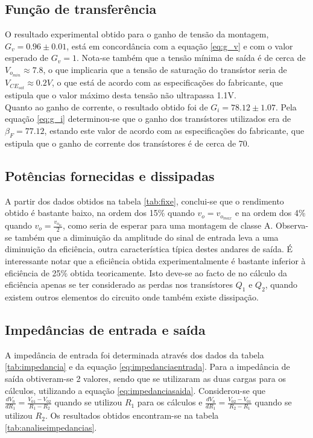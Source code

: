 \documentclass[%
  reprint,
  nofootinbib,
  amsmath,amssymb,
  aps,
  10pt,
  a4paper
]{revtex4-1}
\begin{document}
\subsection{Função de transferência}
O resultado experimental obtido para o ganho de tensão da montagem, $G_v=0.96\pm0.01$, está em concordância com a equação \ref{eq:g_v} e com o valor esperado de $G_v=1$. Nota-se também que a tensão mínima de saída é de cerca de $V_{o_{min}}\approx7.8$, o que implicaria que a tensão de saturação do transístor seria de $V_{{CE}_{sat}}\approx0.2V$, o que está de acordo com as especificações do fabricante, que estipula que o valor máximo desta tensão não ultrapassa 1.1V.\\
Quanto ao ganho de corrente, o resultado obtido foi de $G_i=78.12\pm1.07$. Pela equação \ref{eq:g_i} determinou-se que o ganho dos transístores utilizados era de $\beta_F=77.12$, estando este valor de acordo com as especificações do fabricante, que estipula que o ganho de corrente dos transístores é de cerca de 70.

\subsection{Potências fornecidas e dissipadas}
A partir dos dados obtidos na tabela \ref{tab:fixe}, conclui-se que o rendimento obtido é bastante baixo, na ordem dos 15\% quando $v_o=v_{o_{max}}$ e na ordem dos 4\% quando $v_o=\frac{v_{o_m}}{2}$, como seria de esperar para uma montagem de classe A. Observa-se também que a diminuição da amplitude do sinal de entrada leva a uma diminuição da eficiência, outra característica típica destes andares de saída.  É interessante notar que a eficiência obtida  experimentalmente é bastante inferior à eficiência de 25\% obtida teoricamente. Isto deve-se ao facto de no cálculo da eficiência apenas se ter considerado as perdas nos transístores $Q_1$ e $Q_2$, quando existem outros elementos do circuito onde também existe dissipação.

\subsection{Impedâncias de entrada e saída}
A impedância de entrada foi determinada através dos dados da tabela \ref{tab:impedancia} e da equação \ref{eq:impedanciaentrada}. Para a impedância de saída obtiveram-se 2 valores, sendo que se utilizaram as duas cargas para os cálculos, utilizando a equação \ref{eq:impedanciasaida}. Considerou-se que $\frac{dV_0}{dR_1}=\frac{V_{01}-V_{02}}{R_1-R_2}$ quando se utilizou $R_1$ para os cálculos e $\frac{dV_0}{dR_1}=\frac{V_{02}-V_{01}}{R_2-R_1}$ quando se utilizou $R_2$. Os resultados obtidos encontram-se na tabela \ref{tab:analiseimpedancias}.
\end{document}
